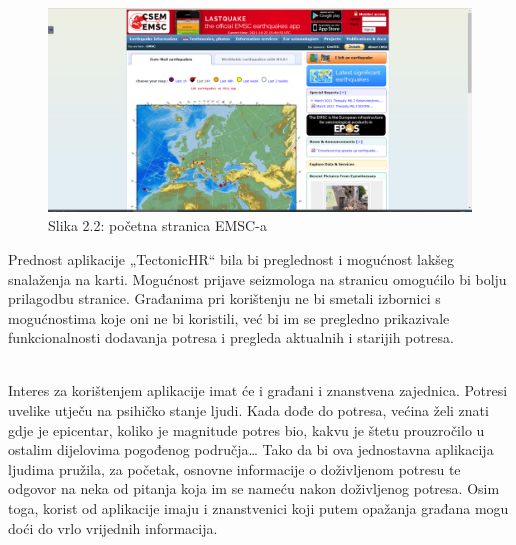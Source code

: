 \begin{figure}[H]
			\includegraphics[width=\textwidth]{slike/emsc1.PNG} %
			\caption{Slika 2.2: početna stranica EMSC-a}
			\label{fig:promjene2} %
		\end{figure}

{Prednost aplikacije „TectonicHR“ bila bi preglednost i mogućnost lakšeg snalaženja na karti. 
Mogućnost prijave seizmologa na stranicu omogućilo bi bolju prilagodbu stranice. Građanima pri korištenju ne bi smetali izbornici s mogućnostima koje oni ne bi koristili, već bi im se pregledno prikazivale funkcionalnosti dodavanja potresa i pregleda aktualnih i starijih potresa. }

\\{Interes za korištenjem aplikacije imat će i građani i znanstvena zajednica. Potresi uvelike utječu na psihičko stanje ljudi. 
Kada dođe do potresa, većina želi znati gdje je epicentar, koliko je magnitude potres bio, kakvu je štetu prouzročilo u ostalim dijelovima pogođenog područja… 
Tako da bi ova jednostavna aplikacija ljudima pružila, za početak, osnovne informacije o doživljenom potresu te odgovor na neka od pitanja koja im se nameću nakon doživljenog potresa. 
Osim toga, korist od aplikacije imaju i znanstvenici koji putem opažanja građana mogu doći do vrlo vrijednih informacija. }\\		
		
\eject
		
	